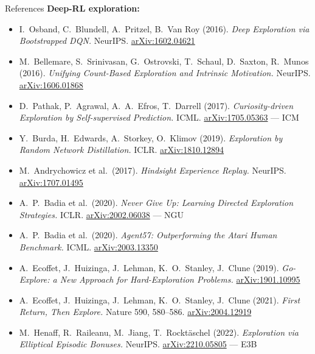 \begin{frame}[allowframebreaks]{References}
\textbf{Deep-RL exploration:}
\begin{itemize}
    \item I.~Osband, C.~Blundell, A.~Pritzel, B.~Van Roy (2016). \emph{Deep Exploration via Bootstrapped DQN.} NeurIPS. \href{https://arxiv.org/abs/1602.04621}{arXiv:1602.04621}
    \item M.~Bellemare, S.~Srinivasan, G.~Ostrovski, T.~Schaul, D.~Saxton, R.~Munos (2016). \emph{Unifying Count-Based Exploration and Intrinsic Motivation.} NeurIPS. \href{https://arxiv.org/abs/1606.01868}{arXiv:1606.01868}
    \item D.~Pathak, P.~Agrawal, A.~A.~Efros, T.~Darrell (2017). \emph{Curiosity-driven Exploration by Self-supervised Prediction.} ICML. \href{https://arxiv.org/abs/1705.05363}{arXiv:1705.05363} --- ICM
    \item Y.~Burda, H.~Edwards, A.~Storkey, O.~Klimov (2019). \emph{Exploration by Random Network Distillation.} ICLR. \href{https://arxiv.org/abs/1810.12894}{arXiv:1810.12894}
    \item M.~Andrychowicz et al.\ (2017). \emph{Hindsight Experience Replay.} NeurIPS. \href{https://arxiv.org/abs/1707.01495}{arXiv:1707.01495}
    \item A.~P.~Badia et al.\ (2020). \emph{Never Give Up: Learning Directed Exploration Strategies.} ICLR. \href{https://arxiv.org/abs/2002.06038}{arXiv:2002.06038} --- NGU
    \item A.~P.~Badia et al.\ (2020). \emph{Agent57: Outperforming the Atari Human Benchmark.} ICML. \href{https://arxiv.org/abs/2003.13350}{arXiv:2003.13350}
    \item A.~Ecoffet, J.~Huizinga, J.~Lehman, K.~O.~Stanley, J.~Clune (2019). \emph{Go-Explore: a New Approach for Hard-Exploration Problems.} \href{https://arxiv.org/abs/1901.10995}{arXiv:1901.10995}
    \item A.~Ecoffet, J.~Huizinga, J.~Lehman, K.~O.~Stanley, J.~Clune (2021). \emph{First Return, Then Explore.} Nature 590, 580--586. \href{https://arxiv.org/abs/2004.12919}{arXiv:2004.12919}
    \item M.~Henaff, R.~Raileanu, M.~Jiang, T.~Rockt\"aschel (2022). \emph{Exploration via Elliptical Episodic Bonuses.} NeurIPS. \href{https://arxiv.org/abs/2210.05805}{arXiv:2210.05805} --- E3B
\end{itemize}


\end{frame}
